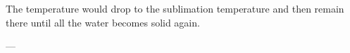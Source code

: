 The temperature would drop to the sublimation temperature and then remain there until all the water becomes solid again.

---
